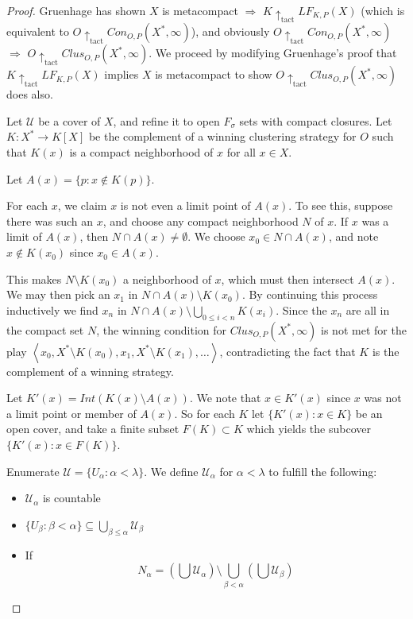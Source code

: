 \documentclass[11pt]{article}
\theoremstyle{plain}
\theoremstyle{definition}
\theoremstyle{remark}
\newcommand{\tactwin}{\uparrow_{\text{tact}}}
\newcommand{\oneptcomp}[1]{#1^*}
\newcommand{\congame}[2]{Con_{O,P}(#1,#2)}
\newcommand{\clusgame}[2]{Clus_{O,P}(#1,#2)}
\newcommand{\lfkpgame}[1]{LF_{K,P}(#1)}
\newcommand{\<}{\langle}
\renewcommand{\>}{\rangle}
\begin{document}
\begin{proof}
Gruenhage has shown $X$ is metacompact $\Rightarrow$ $K\tactwin\lfkpgame{X}$ (which is equivalent to $O\tactwin\congame{\oneptcomp{X}}{\infty}$), and obviously $O\tactwin\congame{\oneptcomp{X}}{\infty}$ $\Rightarrow$ $O\tactwin\clusgame{\oneptcomp{X}}{\infty}$. We proceed by modifying Gruenhage's proof that $K\tactwin\lfkpgame{X}$ implies $X$ is metacompact to show $O\tactwin\clusgame{\oneptcomp{X}}{\infty}$ does also.

Let $\mathcal{U}$ be a cover of $X$, and refine it to open $F_\sigma$ sets with compact closures. Let $K:\oneptcomp{X}\to K[X]$ be the complement of a winning clustering strategy for $O$ such that $K(x)$ is a compact neighborhood of $x$ for all $x\in X$.

Let $A(x)=\{p:x\not\in K(p)\}$.

For each $x$, we claim $x$ is not even a limit point of $A(x)$. To see this, suppose there was such an $x$, and choose any compact neighborhood $N$ of $x$. If $x$ was a limit of $A(x)$, then $N\cap A(x)\not=\emptyset$. We choose $x_0\in N\cap A(x)$, and note $x\not\in K(x_0)$ since $x_0\in A(x)$.

This makes $N\setminus K(x_0)$ a neighborhood of $x$, which must then intersect $A(x)$. We may then pick an $x_1$ in $N\cap A(x)\setminus K(x_0)$. By continuing this process inductively we find $x_n$ in $N\cap A(x) \setminus \bigcup_{0\leq i < n} K(x_i)$. Since the $x_n$ are all in the compact set $N$, the winning condition for $\clusgame{\oneptcomp{X}}{\infty}$ is not met for the play $\left<x_0,\oneptcomp{X}\setminus K(x_0),x_1,\oneptcomp{X}\setminus K(x_1),\dots\right>$, contradicting the fact that $K$ is the complement of a winning strategy.

Let $K'(x)=Int(K(x)\setminus A(x))$. We note that $x\in K'(x)$ since $x$ was not a limit point or member of $A(x)$. So for each $K$ let $\{K'(x):x\in K\}$ be an open cover, and take a finite subset $F(K)\subset K$ which yields the subcover $\{K'(x):x\in F(K)\}$.

Enumerate $\mathcal{U}=\{U_\alpha: \alpha < \lambda\}$. We define $\mathcal{U}_\alpha$ for $\alpha<\lambda$ to fulfill the following:

\begin{itemize}
\item $\mathcal{U}_\alpha$ is countable
\item $\{U_\beta: \beta<\alpha\} \subseteq \bigcup_{\beta\leq\alpha} \mathcal{U}_\beta$
\item If \[N_\alpha = \left(\bigcup \mathcal{U}_\alpha\right) \setminus \bigcup_{\beta<\alpha} \left( \bigcup \mathcal{U}_\beta \right)\]


\end{itemize}
\end{proof}
\end{document}
